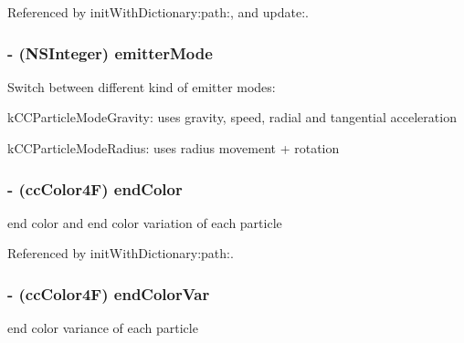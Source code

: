 Referenced by init\-With\-Dictionary\-:path\-:, and update\-:.

\hypertarget{interface_c_c_particle_system_a9fc3e2fcc5581ee70203a1e0a3b38177}{
\subsubsection[{emitter\-Mode}]{\setlength{\rightskip}{0pt plus 5cm}-\/ (N\-S\-Integer) {\bf emitter\-Mode}}}\label{interface_c_c_particle_system_a9fc3e2fcc5581ee70203a1e0a3b38177}
Switch between different kind of emitter modes\-:
\begin{DoxyItemize}
\item k\-C\-C\-Particle\-Mode\-Gravity\-: uses gravity, speed, radial and tangential acceleration
\item k\-C\-C\-Particle\-Mode\-Radius\-: uses radius movement + rotation 
\end{DoxyItemize}\hypertarget{interface_c_c_particle_system_a0d290daeb3cbb33136ff584af20b3aa1}{
\subsubsection[{end\-Color}]{\setlength{\rightskip}{0pt plus 5cm}-\/ ({\bf cc\-Color4\-F}) {\bf end\-Color}}}\label{interface_c_c_particle_system_a0d290daeb3cbb33136ff584af20b3aa1}
end color and end color variation of each particle 

Referenced by init\-With\-Dictionary\-:path\-:.

\hypertarget{interface_c_c_particle_system_ab1b7d80b864563801b6d979892188ae6}{
\subsubsection[{end\-Color\-Var}]{\setlength{\rightskip}{0pt plus 5cm}-\/ ({\bf cc\-Color4\-F}) {\bf end\-Color\-Var}}}\label{interface_c_c_particle_system_ab1b7d80b864563801b6d979892188ae6}
end color variance of each particle 

